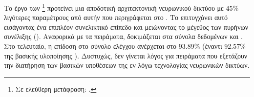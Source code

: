 \subsubsection{}

Το έργο των  \footnote{Σε ελεύθερη μετάφραση: .} \cite{luo2019r} προτείνει μια αποδοτική αρχιτεκτονική νευρωνικού δικτύου με 45\% λιγότερες παραμέτρους από αυτήν που περιγράφεται στο \cite{sabour2017dynamic}. Το επιτυγχάνει αυτό εισάγοντας ένα επιπλέον συνελικτικό επίπεδο και μειώνοντας το μέγεθος των πυρήνων συνέλιξης (). Αναφορικά με τα πειράματα, δοκιμάζεται στα σύνολα δεδομένων  και . Στο τελευταίο, η επίδοση στο σύνολο ελέγχου ανέρχεται στο 93.89\% (έναντι 92.57\% της βασικής υλοποίησης \cite{sabour2017dynamic}). Δυστυχώς, δεν γίνεται λόγος για πειράματα που εξετάζουν την διατήρηση των βασικών υποθέσεων της εν λόγω τεχνολογίας νευρωνικών δικτύων.

